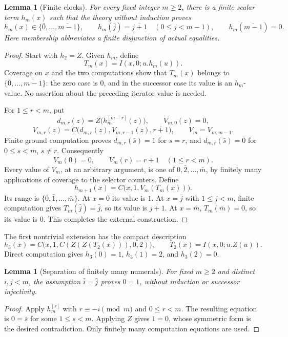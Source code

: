 \documentclass[11pt,letterpaper]{article}
\newtheorem{lemma}[theorem]{Lemma}
\theoremstyle{definition}
\begin{document}
\begin{lemma}[Finite clocks]
For every fixed integer $m\geq2$, there is a finite scalar term $h_m(x)$
such that the theory without induction proves
\[
 h_m(x)\in\{\bar0,\ldots,\overline{m-1}\},\qquad
 h_m(\bar j)=\overline{j+1}\quad(0\leq j<m-1),\qquad
 h_m(\overline{m-1})=0.
\]
Here membership abbreviates a finite disjunction of actual equalities.
\end{lemma}
\begin{proof}
Start with $h_2=Z$. Given $h_m$, define
\[
 T_m(x)=I(x,0;u.h_m(u)).
\]
Coverage on $x$ and the two computations show that $T_m(x)$ belongs to
$\{\bar0,\ldots,\overline{m-1}\}$: the zero case is $0$, and in the
successor case its value is an $h_m$-value. No assertion about the preceding
iterator value is needed.

For $1\leq r<m$, put
\[
 d_{m,r}(z)=Z\bigl(h_m^{[m-r]}(z)\bigr),\qquad
 V_{m,0}(z)=0,
\]
\[
 V_{m,r}(z)=C\bigl(d_{m,r}(z),V_{m,r-1}(z),\overline{r+1}\bigr),
 \qquad V_m=V_{m,m-1}.
\]
Finite ground computation proves
$d_{m,r}(\bar s)=1$ for $s=r$, and $d_{m,r}(\bar s)=0$ for
$0\leq s<m$, $s\ne r$. Consequently
\[
 V_m(0)=0,\qquad V_m(\bar r)=\overline{r+1}\quad(1\leq r<m).
\]
Every value of $V_m$, at an arbitrary argument, is one of
$0,\bar2,\ldots,\bar m$, by finitely many applications of coverage to
the selector counters. Define
\[
 \boxed{\quad h_{m+1}(x)=C\bigl(x,1,V_m(T_m(x))\bigr).\quad}
\]
Its range is $\{0,\bar1,\ldots,\bar m\}$. At $x=0$ its value is $1$.
At $x=\bar j$ with $1\leq j<m$, finite computation gives
$T_m(\bar j)=\bar j$, so its value is $\overline{j+1}$. At $x=\bar m$,
$T_m(\bar m)=0$, so its value is $0$. This completes the external
construction.
\end{proof}

The first nontrivial extension has the compact description
\[
 h_3(x)=C\bigl(x,1,C(Z(Z(T_2(x))),0,2)\bigr),
 \qquad T_2(x)=I(x,0;u.Z(u)).
\]
Direct computation gives $h_3(0)=1$, $h_3(1)=2$, and $h_3(2)=0$.

\begin{lemma}[Separation of finitely many numerals]
For fixed $m\geq2$ and distinct $i,j<m$, the assumption
$\bar i=\bar j$ proves $0=1$, without induction or successor injectivity.
\end{lemma}
\begin{proof}
Apply $h_m^{[r]}$ with $r\equiv-i\pmod m$ and $0\leq r<m$.
The resulting equation is $0=\bar s$ for some $1\leq s<m$.
Applying $Z$ gives $1=0$, whose symmetric form is the desired
contradiction. Only finitely many computation equations are used.
\end{proof}
\end{document}

